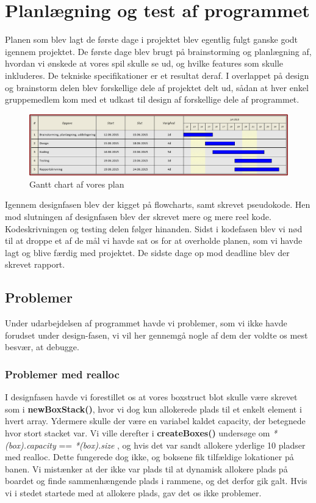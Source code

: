 \section{Planlægning og test af programmet}

Planen som blev lagt de første dage i projektet blev egentlig fulgt ganske godt igennem projektet. De første dage blev brugt på brainstorming og planlægning af, hvordan vi ønskede at vores spil skulle se ud, og hvilke features som skulle inkluderes. De tekniske specifikationer er et resultat deraf. I overlappet på design og brainstorm delen blev forskellige dele af projektet delt ud, sådan at hver enkel gruppemedlem kom med et udkast til design af forskellige dele af programmet.
\begin{figure}[h]
\begin{center}
\includegraphics[scale=0.6]{img/Gantt_Chart.png}
\caption{Gantt chart af vores plan}
\end{center}
\end{figure}
 Igennem designfasen blev der kigget på flowcharts, samt skrevet pseudokode. Hen mod slutningen af designfasen blev der skrevet mere og mere reel kode. Kodeskrivningen og testing delen følger hinanden. Sidst i kodefasen blev vi nød til at droppe et af de mål vi havde sat os for at overholde planen, som vi havde lagt og blive færdig med projektet.  De sidste dage op mod deadline blev der skrevet rapport.
\subsection{Problemer}
Under udarbejdelsen af programmet havde vi problemer, som vi ikke havde forudset under design-fasen, vi vil her gennemgå nogle af dem der voldte os mest besvær, at debugge.
\subsubsection{Problemer med realloc}
\label{reallocfejl}
I designfasen havde vi forestillet os at vores boxstruct blot skulle være skrevet som i \textbf{newBoxStack()}, hvor vi dog kun allokerede plads til et enkelt element i hvert array. Ydermere skulle der være en variabel kaldet capacity, der betegnede hvor stort stacket var. Vi ville derefter i \textbf{createBoxes()} undersøge om \textit{*(box).capacity} == \textit{*(box).size} , og hvis det var sandt allokere yderlige 10 pladser med realloc. Dette fungerede dog ikke, og boksene fik tilfældige lokationer på banen. Vi mistænker at der ikke var plads til at dynamisk allokere plads på boardet og finde sammenhængende plads i rammene, og det derfor gik galt. Hvis vi i stedet startede med at allokere plads, gav det os ikke problemer.
